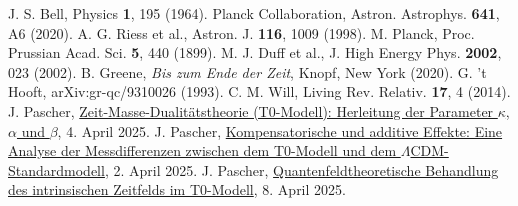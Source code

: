 \documentclass[12pt,a4paper]{article}
\begin{document}
\begin{thebibliography}{99}
		 J. S. Bell, Physics \textbf{1}, 195 (1964).
		 Planck Collaboration, Astron. Astrophys. \textbf{641}, A6 (2020).
		 A. G. Riess et al., Astron. J. \textbf{116}, 1009 (1998).
		 M. Planck, Proc. Prussian Acad. Sci. \textbf{5}, 440 (1899).
		 M. J. Duff et al., J. High Energy Phys. \textbf{2002}, 023 (2002).
		 B. Greene, \textit{Bis zum Ende der Zeit}, Knopf, New York (2020).
		 G. 't Hooft, arXiv:gr-qc/9310026 (1993).
		 C. M. Will, Living Rev. Relativ. \textbf{17}, 4 (2014).
		 J. Pascher, \href{https://github.com/jpascher/T0-Time-Mass-Duality/tree/main/2/pdf/Deutsch/Zeit-Masse-Dualit\%C3\%A4tstheorie (T0-Modell) Herleitung der Parameter kappa, alpha und beta.pdf}{Zeit-Masse-Dualitätstheorie (T0-Modell): Herleitung der Parameter \(\kappa\), \(\alpha\) und \(\beta\)}, 4. April 2025.
		 J. Pascher, \href{https://github.com/jpascher/T0-Time-Mass-Duality/tree/main/2/pdf/Deutsch/Analyse der Messdifferenzen zwischen dem T0-Modell und dem Standardmodell.pdf}{Kompensatorische und additive Effekte: Eine Analyse der Messdifferenzen zwischen dem T0-Modell und dem \(\Lambda\)CDM-Standardmodell}, 2. April 2025.
		 J. Pascher, \href{https://github.com/jpascher/T0-Time-Mass-Duality/tree/main/2/pdf/Deutsch/Quantenfeldtheoretische Behandlung des intrinsischen Zeitfelds im T0-Modell.pdf}{Quantenfeldtheoretische Behandlung des intrinsischen Zeitfelds im T0-Modell}, 8. April 2025.
	\end{thebibliography}
	
\end{document}
